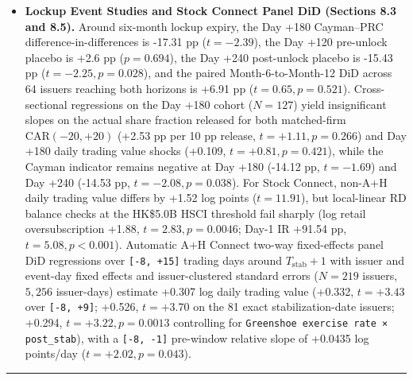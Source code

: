 \documentclass[11pt,letterpaper]{article}
\begin{document}
\begin{itemize}
\item \textbf{Lockup Event Studies and Stock Connect Panel DiD (Sections 8.3 and 8.5).} Around six-month lockup expiry, the Day +180 Cayman–PRC difference-in-differences is -17.31 pp ($t = -2.39$), the Day +120 pre-unlock placebo is +2.6 pp ($p = 0.694$), the Day +240 post-unlock placebo is -15.43 pp ($t = -2.25, p = 0.028$), and the paired Month-6-to-Month-12 DiD across 64 issuers reaching both horizons is +6.91 pp ($t = 0.65, p = 0.521$). Cross-sectional regressions on the Day +180 cohort ($N = 127$) yield insignificant slopes on the actual share fraction released for both matched-firm $\text{CAR}(-20, +20)$ (+2.53 pp per 10 pp release, $t = +1.11, p = 0.266$) and Day +180 daily trading value shocks (+0.109, $t = +0.81, p = 0.421$), while the Cayman indicator remains negative at Day +180 (-14.12 pp, $t = -1.69$) and Day +240 (-14.53 pp, $t = -2.08, p = 0.038$). For Stock Connect, non-A+H daily trading value differs by +1.52 log points ($t = 11.91$), but local-linear RD balance checks at the HK\$5.0B HSCI threshold fail sharply (log retail oversubscription +1.88, $t = 2.83, p = 0.0046$; Day-1 IR +91.54 pp, $t = 5.08, p < 0.001$). Automatic A+H Connect two-way fixed-effects panel DiD regressions over \texttt{\small [-8, +15]} trading days around $T_{\text{stab}}+1$ with issuer and event-day fixed effects and issuer-clustered standard errors ($N = 219$ issuers, $5,256$ issuer-days) estimate +0.307 log daily trading value (+0.332, $t = +3.43$ over \texttt{\small [-8, +9]}; +0.526, $t = +3.70$ on the 81 exact stabilization-date issuers; +0.294, $t = +3.22, p = 0.0013$ controlling for \texttt{\small Greenshoe exercise rate × post\_\allowbreak{}stab}), with a \texttt{\small [-8, -1]} pre-window relative slope of +0.0435 log points/day ($t = +2.02, p = 0.043$).
\end{itemize}

\par\medskip\noindent\rule{\linewidth}{0.35pt}\par\medskip
\end{document}
